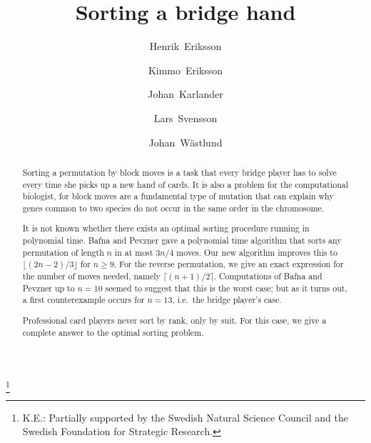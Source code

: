 \documentclass[11pt]{amsart} %
\begin{document}
\title{Sorting a bridge hand}
\author[H.~Eriksson]{Henrik~Eriksson}
\address{NADA, KTH, SE-100 44, Stockholm, Sweden}
\author[K.~Eriksson]{Kimmo~Eriksson}
\thanks{K.E.: Partially supported by the Swedish Natural Science
  Council and the Swedish Foundation for Strategic Research.}
\address{IMa, M{\"a}lardalens H{\"o}gskola, Box 883, SE-721 23 V{\"a}ster{\aa}s}
\author[J.~Karlander]{Johan~Karlander}
\author[L.~Svensson]{Lars~Svensson}
\author[J.~W{\"a}stlund]{Johan~W{\"a}stlund}
\address{Department of Mathematics, KTH, SE-100 44, Stockholm, Sweden}

\date{}

\begin{abstract}
Sorting a permutation by block moves is a task that every bridge
player has to solve every time she picks up a new hand of cards.
It is also a problem for the computational biologist, for block
moves are a fundamental type of mutation that can explain why genes
common to two species do not occur in the same order in the chromosome.

It is not known whether there exists an optimal sorting procedure running in
polynomial time. Bafna and Pevzner gave a polynomial time algorithm that
sorts any permutation of length $n$ in at most $3n/4$ moves.
Our new algorithm improves this to $\lfloor (2n-2)/3 \rfloor$ for $n\ge 9$.
For the reverse permutation, we give an exact expression for the
number of moves needed, namely $\lceil (n+1)/2 \rceil$. Computations
of Bafna and Pevzner up to $n=10$ seemed to suggest that this is the
worst case; but as it turns out, a first counterexample occurs
for $n=13$, i.e.~the bridge player's case. 

Professional card players never sort by rank, only by suit. For
this case, we give a complete answer to the optimal sorting problem.

\end{abstract}
\maketitle
\end{document}

